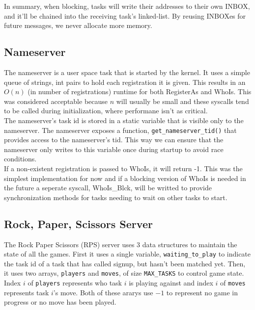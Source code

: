 \documentclass[letterpaper]{article}
\begin{document}
In summary, when blocking, tasks will write their addresses to their own INBOX, and it'll be chained into the receiving task's linked-list. By reusing INBOXes for future messages, we never allocate more memory.

\subsection{Nameserver}

The nameserver is a user space task that is started by the kernel. It uses a simple queue of strings, int pairs to hold each registration it is given. This results in an $O(n)$ (in number of registrations) runtime for both RegisterAs and WhoIs. This was considered acceptable because $n$ will usually be small and these syscalls tend to be called during initialization, where performane isn't as critical. \\

The nameserver's task id is stored in a static variable that is visible only to the nameserver. The nameserver exposes a function, {\tt get\_nameserver\_tid()} that provides access to the nameserver's tid. This way we can ensure that the nameserver only writes to this variable once during startup to avoid race conditions. \\

If a non-existent registration is passed to WhoIs, it will return -1. This was the simplest implementation for now and if a blocking version of WhoIs is needed in the future a seperate syscall, WhoIs\_Blck, will be writted to provide synchronization methods for tasks needing to wait on other tasks to start.

\subsection{Rock, Paper, Scissors Server}

The Rock Paper Scissors (RPS) server uses 3 data structures to maintain the state of all the games. First it uses a single variable, {\tt waiting\_to\_play} to indicate the task id of a task that has called signup, but hasn't been matched yet. Then, it uses two arrays, {\tt players} and {\tt moves}, of size {\tt MAX\_TASKS} to control game state. Index $i$ of {\tt players} represents who task $i$ is playing against and index $i$ of {\tt moves} represents task $i$'s move. Both of these ararys use $-1$ to represent no game in progress or no move has been played. \\
\end{document}
